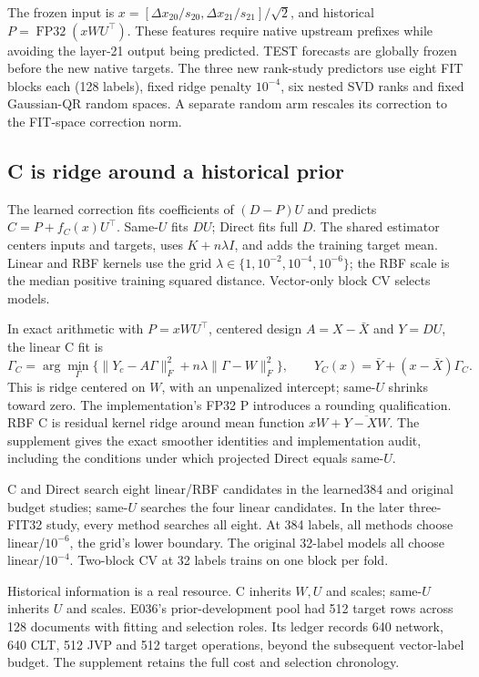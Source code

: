 \documentclass[11pt]{article}
\begin{document}
The frozen input is $x=[\Delta x_{20}/s_{20},\Delta x_{21}/s_{21}]/\sqrt2$, and historical $P=\operatorname{FP32}(xWU^\top)$. These features require native upstream prefixes while avoiding the layer-21 output being predicted. TEST forecasts are globally frozen before the new native targets. The three new rank-study predictors use eight FIT blocks each (128 labels), fixed ridge penalty $10^{-4}$, six nested SVD ranks and fixed Gaussian-QR random spaces. A separate random arm rescales its correction to the FIT-space correction norm.

\subsection{C is ridge around a historical prior}
The learned correction fits coefficients of $(D-P)U$ and predicts $C=P+f_C(x)U^\top$. Same-$U$ fits $DU$; Direct fits full $D$. The shared estimator centers inputs and targets, uses $K+n\lambda I$, and adds the training target mean. Linear and RBF kernels use the grid $\lambda\in\{1,10^{-2},10^{-4},10^{-6}\}$; the RBF scale is the median positive training squared distance. Vector-only block CV selects models.

In exact arithmetic with $P=xWU^\top$, centered design $A=X-\bar X$ and $Y=DU$, the linear C fit is
\[
 \Gamma_C=\arg\min_\Gamma\big\{\|Y_c-A\Gamma\|_F^2+n\lambda\|\Gamma-W\|_F^2\big\},
 \qquad \widehat Y_C(x)=\bar Y+(x-\bar X)\Gamma_C.
\]
This is ridge centered on $W$, with an unpenalized intercept; same-$U$ shrinks toward zero. The implementation's FP32 P introduces a rounding qualification. RBF C is residual kernel ridge around mean function $xW+\overline{Y-XW}$. The supplement gives the exact smoother identities and implementation audit, including the conditions under which projected Direct equals same-$U$.

C and Direct search eight linear/RBF candidates in the learned384 and original budget studies; same-$U$ searches the four linear candidates. In the later three-FIT32 study, every method searches all eight. At 384 labels, all methods choose linear/$10^{-6}$, the grid's lower boundary. The original 32-label models all choose linear/$10^{-4}$. Two-block CV at 32 labels trains on one block per fold.

Historical information is a real resource. C inherits $W,U$ and scales; same-$U$ inherits $U$ and scales. E036's prior-development pool had 512 target rows across 128 documents with fitting and selection roles. Its ledger records 640 network, 640 CLT, 512 JVP and 512 target operations, beyond the subsequent vector-label budget. The supplement retains the full cost and selection chronology.
\end{document}
